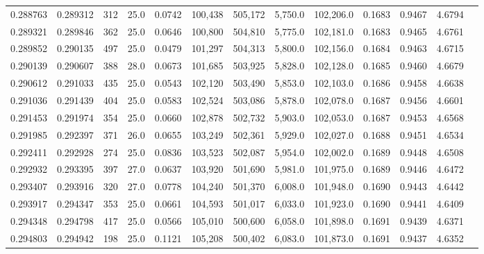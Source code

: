 \begin{tabular}{rrrrrrrrrrrrr}
0.288763 & 0.289312 &   312 & 25.0 &                                     0.0742 & 100,438 & 505,172 &   5,750.0 & 102,206.0 & 0.1683 & 0.9467 & 4.6794 \\
0.289321 & 0.289846 &   362 & 25.0 &                                     0.0646 & 100,800 & 504,810 &   5,775.0 & 102,181.0 & 0.1683 & 0.9465 & 4.6761 \\
0.289852 & 0.290135 &   497 & 25.0 &                                     0.0479 & 101,297 & 504,313 &   5,800.0 & 102,156.0 & 0.1684 & 0.9463 & 4.6715 \\
0.290139 & 0.290607 &   388 & 28.0 &                                     0.0673 & 101,685 & 503,925 &   5,828.0 & 102,128.0 & 0.1685 & 0.9460 & 4.6679 \\
0.290612 & 0.291033 &   435 & 25.0 &                                     0.0543 & 102,120 & 503,490 &   5,853.0 & 102,103.0 & 0.1686 & 0.9458 & 4.6638 \\
0.291036 & 0.291439 &   404 & 25.0 &                                     0.0583 & 102,524 & 503,086 &   5,878.0 & 102,078.0 & 0.1687 & 0.9456 & 4.6601 \\
0.291453 & 0.291974 &   354 & 25.0 &                                     0.0660 & 102,878 & 502,732 &   5,903.0 & 102,053.0 & 0.1687 & 0.9453 & 4.6568 \\
0.291985 & 0.292397 &   371 & 26.0 &                                     0.0655 & 103,249 & 502,361 &   5,929.0 & 102,027.0 & 0.1688 & 0.9451 & 4.6534 \\
0.292411 & 0.292928 &   274 & 25.0 &                                     0.0836 & 103,523 & 502,087 &   5,954.0 & 102,002.0 & 0.1689 & 0.9448 & 4.6508 \\
0.292932 & 0.293395 &   397 & 27.0 &                                     0.0637 & 103,920 & 501,690 &   5,981.0 & 101,975.0 & 0.1689 & 0.9446 & 4.6472 \\
0.293407 & 0.293916 &   320 & 27.0 &                                     0.0778 & 104,240 & 501,370 &   6,008.0 & 101,948.0 & 0.1690 & 0.9443 & 4.6442 \\
0.293917 & 0.294347 &   353 & 25.0 &                                     0.0661 & 104,593 & 501,017 &   6,033.0 & 101,923.0 & 0.1690 & 0.9441 & 4.6409 \\
0.294348 & 0.294798 &   417 & 25.0 &                                     0.0566 & 105,010 & 500,600 &   6,058.0 & 101,898.0 & 0.1691 & 0.9439 & 4.6371 \\
0.294803 & 0.294942 &   198 & 25.0 &                                     0.1121 & 105,208 & 500,402 &   6,083.0 & 101,873.0 & 0.1691 & 0.9437 & 4.6352 \\

\end{tabular}
